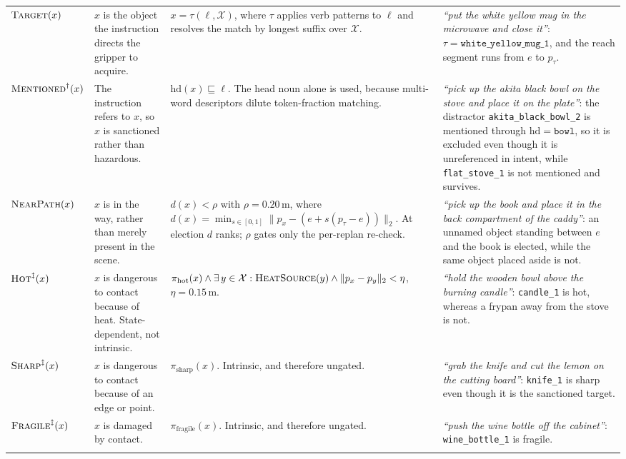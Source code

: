 \begin{table}[t]
\begin{tabular}{@{}l p{} p{} p{}@{}}
$\textsc{Target}(x)$ &
$x$ is the object the instruction directs the gripper to acquire. &
$x=\tau(\ell,\mathcal{X})$, where $\tau$ applies verb patterns to $\ell$ and
resolves the match by longest suffix over $\mathcal{X}$. &
\textit{``put the white yellow mug in the microwave and close it''}:
$\tau=\texttt{white\_yellow\_mug\_1}$, and the reach segment runs from $e$ to
$p_\tau$. \\
\addlinespace[3pt]

$\textsc{Mentioned}^{\dagger}(x)$ &
The instruction refers to $x$, so $x$ is sanctioned rather than hazardous. &
$\mathrm{hd}(x)\sqsubseteq \ell$. The head noun alone is used, because
multi-word descriptors dilute token-fraction matching. &
\textit{``pick up the akita black bowl on the stove and place it on the
plate''}: the distractor \texttt{akita\_black\_bowl\_2} is mentioned through
$\mathrm{hd}=\texttt{bowl}$, so it is excluded even though it is unreferenced in
intent, while \texttt{flat\_stove\_1} is not mentioned and survives. \\
\addlinespace[3pt]

$\textsc{NearPath}(x)$ &
$x$ is in the way, rather than merely present in the scene. &
$d(x)<\rho$ with $\rho=0.20$\,m, where
$d(x)=\min_{s\in[0,1]}\lVert p_x-(e+s(p_\tau-e))\rVert_2$. At election $d$
ranks; $\rho$ gates only the per-replan re-check. &
\textit{``pick up the book and place it in the back compartment of the
caddy''}: an unnamed object standing between $e$ and the book is elected, while
the same object placed aside is not. \\
\addlinespace[3pt]

$\textsc{Hot}^{\ddagger}(x)$ &
$x$ is dangerous to contact because of heat. State-dependent, not intrinsic. &
$\pi_{\mathrm{hot}}(x)\wedge\exists\, y\in\mathcal{X}:
\textsc{HeatSource}(y)\wedge\lVert p_x-p_y\rVert_2<\eta$, $\eta=0.15$\,m. &
\textit{``hold the wooden bowl above the burning candle''}: \texttt{candle\_1}
is hot, whereas a frypan away from the stove is not. \\
\addlinespace[3pt]

$\textsc{Sharp}^{\ddagger}(x)$ &
$x$ is dangerous to contact because of an edge or point. &
$\pi_{\mathrm{sharp}}(x)$. Intrinsic, and therefore ungated. &
\textit{``grab the knife and cut the lemon on the cutting board''}:
\texttt{knife\_1} is sharp even though it is the sanctioned target. \\
\addlinespace[3pt]

$\textsc{Fragile}^{\ddagger}(x)$ &
$x$ is damaged by contact. &
$\pi_{\mathrm{fragile}}(x)$. Intrinsic, and therefore ungated. &
\textit{``push the wine bottle off the cabinet''}: \texttt{wine\_bottle\_1} is
fragile. \\
\addlinespace[3pt]


\end{tabular}
\end{table}
